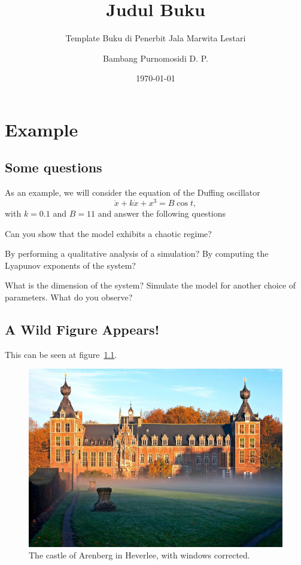 \documentclass[oneside,a4paper,11pt,explicit]{book}
\title{Judul Buku}
\subtitle{Template Buku di Penerbit Jala Marwita Lestari}
\date{\today}
\author{Bambang Purnomosidi D. P.}
\begin{document}
\maketitle

\chapter{Example}
\lipsum[1]

\section{Some questions}
\lipsum[2]

As an example, we will consider the equation of the Duffing oscillator
\begin{equation}
\ddot{x}+k\dot{x}+x^3=B\cos t,
\end{equation}
with $k=0.1$ and $B=11$ and answer the following questions

\begin{questions}
\question Can you show that the model exhibits a chaotic regime?
\begin{tasks}
\task By performing a qualitative analysis of a simulation?
\task By computing the Lyapunov exponents of the system?
\end{tasks}
\question What is the dimension of the system?
\question Simulate the model for another choice of parameters. What do you observe?
\end{questions}

\section{A Wild Figure Appears!}
\lipsum[3] This can be seen at figure~\ref{fig:example}.

\begin{figure}[h]
    \centering
    \includegraphics[width=\textwidth]{img/arenberg.jpg}
    \caption{The castle of Arenberg in Heverlee, with windows corrected.}
    \label{fig:example}
\end{figure}
\end{document}
